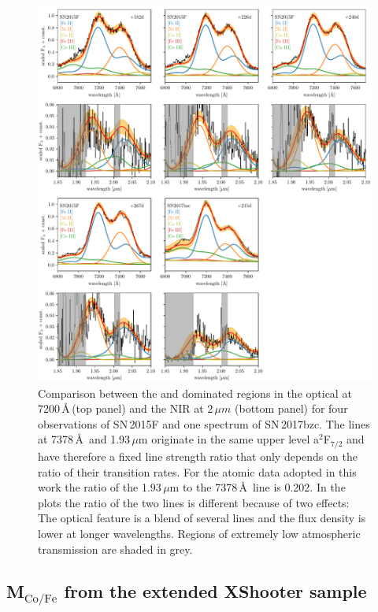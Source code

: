 \documentclass[fleqn,usenatbib]{mnras}
\begin{document}
\begin{figure}
	\includegraphics[width=\linewidth]{plots/NiII_OPT_NIR.pdf}
    \caption{Comparison between the  and  dominated regions in the optical at 7200\,\AA\,(top panel) and the NIR at $2\,\mu m$ (bottom panel) for four observations of SN\,2015F and one spectrum of SN\,2017bzc. The  lines at 7378\,\AA\, and 1.93\,$\mu$m originate in the same upper level a$^2$F$_{7/2}$ and have therefore a fixed line strength ratio that only depends on the ratio of their transition rates. For the atomic data adopted in this work the ratio of the 1.93\,$\mu$m to the 7378\,\AA\, line is 0.202. In the plots the ratio of the two lines is different because of two effects: The optical  feature is a blend of several lines and the flux density is lower at longer wavelengths. Regions of extremely low atmospheric transmission are shaded in grey.}
    \label{SN2015F_NiII}
\end{figure}

\subsection{M$_\text{Co/Fe}$ from the extended XShooter sample}
\end{document}

